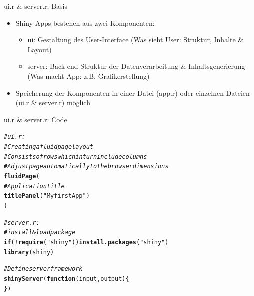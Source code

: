 \documentclass[xcolor=dvipsnames]{beamer}\usepackage[]{graphicx}\usepackage[]{color}
\makeatletter
\newcommand{\hlstr}[1]{\textcolor[rgb]{0.192,0.494,0.8}{#1}}%
\newcommand{\hlcom}[1]{\textcolor[rgb]{0.678,0.584,0.686}{\textit{#1}}}%
\newcommand{\hlopt}[1]{\textcolor[rgb]{0,0,0}{#1}}%
\newcommand{\hlstd}[1]{\textcolor[rgb]{0.345,0.345,0.345}{#1}}%
\newcommand{\hlkwa}[1]{\textcolor[rgb]{0.161,0.373,0.58}{\textbf{#1}}}%
\newcommand{\hlkwc}[1]{\textcolor[rgb]{0.333,0.667,0.333}{#1}}%
\newcommand{\hlkwd}[1]{\textcolor[rgb]{0.737,0.353,0.396}{\textbf{#1}}}%
\newenvironment{kframe}{%
 \def\at@end@of@kframe{}%
 \ifinner\ifhmode%
  \def\at@end@of@kframe{\end{minipage}}%
  \begin{minipage}{\columnwidth}%
 \fi\fi%
 \def\FrameCommand##1{\hskip\@totalleftmargin \hskip-\fboxsep
 \colorbox{shadecolor}{##1}\hskip-\fboxsep
     \hskip-\linewidth \hskip-\@totalleftmargin \hskip\columnwidth}%
 \MakeFramed {\advance\hsize-\width
   \@totalleftmargin\z@ \linewidth\hsize
   \@setminipage}}%
 {\par\unskip\endMakeFramed%
 \at@end@of@kframe}
\newenvironment{knitrout}{}{} %
\makeatother
\begin{document}
\begin{frame}{ui.r \& server.r: Basis}
    \begin{itemize}
      \item Shiny-Apps bestehen aus zwei Komponenten:
        \begin{itemize}
          \item ui: Gestaltung des User-Interface (Was sieht User: Struktur, Inhalte \& Layout)
          \item server: Back-end Struktur der Datenverarbeitung \& Inhaltsgenerierung (Was macht App: z.B. Grafikerstellung)
        \end{itemize}
      \item Speicherung der Komponenten in einer Datei (app.r) oder einzelnen Dateien (ui.r \& server.r) möglich
    \end{itemize}
\end{frame}



\begin{frame}[fragile]{ui.r \& server.r: Code}
\begin{knitrout}\small
{}\color{fgcolor}\begin{kframe}
\begin{alltt}
\hlcom{#ui.r:}
\hlcom{# Creating a fluid page layout}
  \hlcom{# Consists of rows which in turn include columns}
  \hlcom{# Adjust page automatically to the browser dimensions}
\hlkwd{fluidPage}\hlstd{(}
    \hlcom{# Application title}
      \hlkwd{titlePanel}\hlstd{(}\hlstr{"My first App"}\hlstd{)}
\hlstd{)}
\end{alltt}
\end{kframe}
\end{knitrout}

\begin{knitrout}\small
{}\color{fgcolor}\begin{kframe}
\begin{alltt}
\hlcom{#server.r:}
\hlcom{#install & load package}
  \hlkwa{if}\hlstd{(}\hlopt{!}\hlkwd{require}\hlstd{(}\hlstr{"shiny"}\hlstd{))} \hlkwd{install.packages}\hlstd{(}\hlstr{"shiny"}\hlstd{)}
  \hlkwd{library}\hlstd{(shiny)}

\hlcom{#Define server framework}
\hlkwd{shinyServer}\hlstd{(}\hlkwa{function}\hlstd{(}\hlkwc{input}\hlstd{,} \hlkwc{output}\hlstd{) \{}
\hlstd{\})}
\end{alltt}
\end{kframe}
\end{knitrout}

\end{frame}
\end{document}
